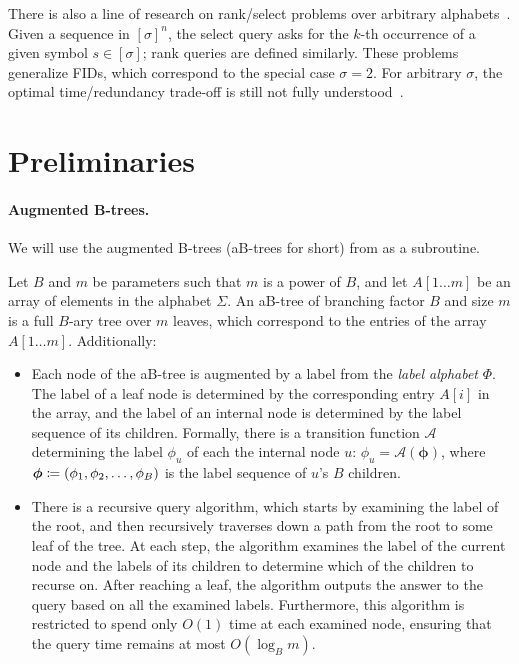 \documentclass{article}
\theoremstyle{plain}
\theoremstyle{definition}  \newtheorem{definition}[theorem]{Definition}
\DeclarePairedDelimiter{\bk}{(}{)}
\newcommand{\defeq}{\coloneqq}
\renewcommand{\vec}[1]{\bm{#1}}
\begin{document}
There is also a line of research on rank/select problems over arbitrary alphabets~\cite{grossi2003highorder,golynski2006rank,ferragina2007compressed,golynski2008redundancya,grossi2010optimal,barbay2014efficient,belazzougui2015optimal}. Given a sequence in $[\sigma]^n$, the select query asks for the $k$-th occurrence of a given symbol $s \in [\sigma]$; rank queries are defined similarly. These problems generalize FIDs, which correspond to the special case $\sigma = 2$. For arbitrary $\sigma$, the optimal time/redundancy trade-off is still not fully understood~\cite{belazzougui2015optimal}.
  

\section{Preliminaries}
\paragraph*{Augmented B-trees.}
We will use the augmented B-trees (aB-trees for short) from \cite{patrascu2008succincter} as a subroutine. 

Let $B$ and $m$ be parameters such that $m$ is a power of $B$, and let $A[1\ldots m]$ be an array of elements in the alphabet $\Sigma$. An aB-tree of branching factor $B$ and size $m$ is a full $B$-ary tree over $m$ leaves, which correspond to the entries of the array $A[1\ldots m]$. Additionally:
\begin{itemize}
  \item Each node of the aB-tree is augmented by a label from the \emph{label alphabet} $\Phi$. The label of a leaf node is determined by the corresponding entry $A[i]$ in the array, and the label of an internal node is determined by the label sequence of its children. Formally, there is a transition function $\mathcal{A}$ determining the label $\phi_u$ of each the internal node $u$: $\phi_u = \mathcal{A}(\vec{\phi})$, where $\vec{\phi} \defeq \bk{\phi_1, \phi_2, \ldots, \phi_B}$ is the label sequence of $u$'s $B$ children.
  \item There is a recursive query algorithm, which starts by examining the label of the root, and then recursively traverses down a path from the root to some leaf of the tree. At each step, the algorithm examines the label of the current node and the labels of its children to determine which of the children to recurse on. After reaching a leaf, the algorithm outputs the answer to the query based on all the examined labels. Furthermore, this algorithm is restricted to spend only $O(1)$ time at each examined node, ensuring that the query time remains at most $O(\log_B m)$.
\end{itemize}
\end{document}

